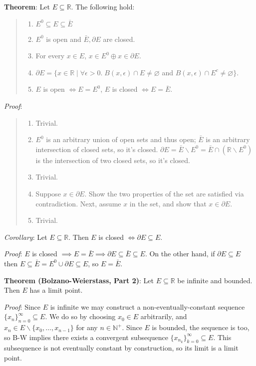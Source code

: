 \documentclass[11pt]{article}
\begin{document}
\textbf{Theorem}: Let $E \subseteq \mathbb{R}$. The following hold:
\begin{quote}\vspace{-0.3cm}
	\begin{enumerate}
	\item $E^0 \subseteq E \subseteq \bar{E}$
	\item $E^0$ is open and $\bar{E}, \partial E$ are closed.
	\item For every $x \in E$, $x \in E^0 \oplus x \in \partial E$.
	\item $\partial E = \{x \in \mathbb{R} \;|\; \forall \epsilon > 0.\; B(x, \epsilon) \cap E \neq \varnothing$ and $B(x, \epsilon) \cap E^c \neq \varnothing\}$.
	\item $E$ is open $\iff E = E^0$, $E$ is closed $\iff E = \bar{E}$.
	\end{enumerate}
\end{quote}
\emph{Proof}:
\begin{quote}\vspace{-0.3cm}
	\begin{enumerate}
	\item Trivial.
	\item $E^0$ is an arbitrary union of open sets and thus open; $\bar{E}$ is an arbitrary intersection of closed sets, so it's closed. $\partial E = \bar{E} \backslash E^0 = \bar{E} \cap (\mathbb{R} \backslash E^0)$ is the intersection of two closed sets, so it's closed.
	\item Trivial.
	\item Suppose $x \in \partial E$. Show the two properties of the set are satisfied via contradiction. Next, assume $x$ in the set, and show that $x \in \partial E$.
	\item Trivial.
	\end{enumerate}
\end{quote}

\emph{Corollary}: Let $E \subseteq \mathbb{R}$. Then $E$ is closed $\iff \partial E \subseteq E$.

\emph{Proof}: $E$ is closed $\implies E = \bar{E} \implies \partial E \subseteq \bar{E} \subseteq E$. On the other hand, if $\partial E \subseteq E$ then $E \subseteq \bar{E} = E^0 \cup \partial E \subseteq E$, so $E = \bar{E}$.

\textbf{Theorem (Bolzano-Weierstass, Part 2)}: Let $E \subseteq \mathbb{R}$ be infinite and bounded. Then $E$ has a limit point.

\emph{Proof}: Since $E$ is infinite we may construct a non-eventually-constant sequence $\{x_n\}_{n=0}^\infty \subseteq E$. We do so by choosing $x_0 \in E$ arbitrarily, and $x_n \in E \backslash \{x_0, \ldots, x_{n-1}\}$ for any $n \in \mathbb{N}^+$. Since $E$ is bounded, the sequence is too, so B-W implies there exists a convergent subsequence $\{x_{n_k}\}_{k=0}^\infty \subseteq E$. This subsequence is not eventually constant by construction, so its limit is a limit point.
\end{document}
